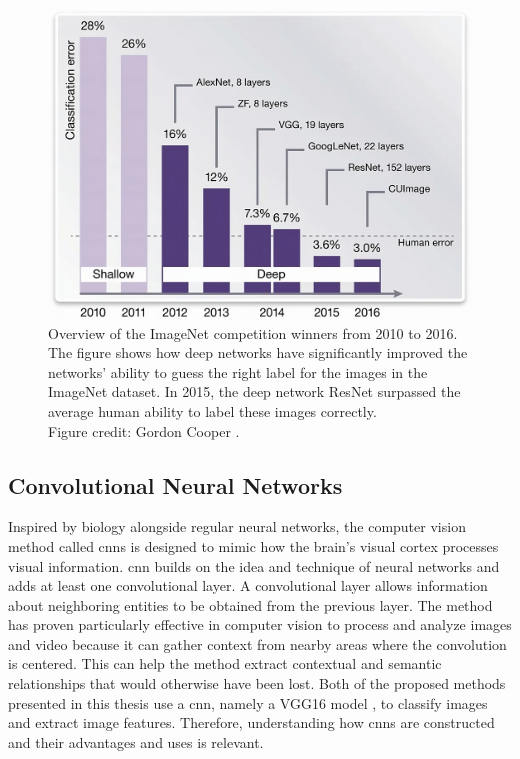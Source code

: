     \begin{figure}[htb]
        \centering
        \includegraphics[width=\linewidth]{images/imagenet_results_graph.jpeg}
        \caption[Overview of the ImageNet competition winners from 2010 to 2016.]{Overview of the ImageNet competition winners from 2010 to 2016. The figure shows how deep networks have significantly improved the networks' ability to guess the right label for the images in the ImageNet dataset. In 2015, the deep network ResNet \cite{heDeepResidualLearning2015} surpassed the average human ability to label these images correctly. \\
        Figure credit: Gordon Cooper \cite{cooperSoftwareFrameworkRequirements2017}.}
        \label{fig:imagenet_results_graph}
    \end{figure}


    
    \subsection{Convolutional Neural Networks}

    Inspired by biology alongside regular neural networks, the computer vision method called \glspl{cnn} is designed to mimic how the brain's visual cortex processes visual information. \gls{cnn} builds on the idea and technique of neural networks and adds at least one convolutional layer. A convolutional layer allows information about neighboring entities to be obtained from the previous layer. The method has proven particularly effective in computer vision to process and analyze images and video because it can gather context from nearby areas where the convolution is centered. This can help the method extract contextual and semantic relationships that would otherwise have been lost. Both of the proposed methods presented in this thesis use a \gls{cnn}, namely a VGG16 model \cite{simonyanVeryDeepConvolutional2015}, to classify images and extract image features. Therefore, understanding how \glspl{cnn} are constructed and their advantages and uses is relevant.

